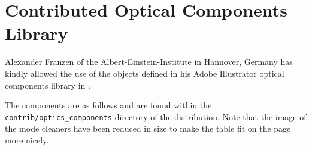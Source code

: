 % 
%
%


\chapter{Contributed Optical Components Library}

Alexander Franzen of the Albert-Einstein-Institute in Hannover, Germany has
kindly allowed the use of the objects defined in his Adobe Illustrator 
optical components library in \pyscript.

The components are as follows and are found within the
\texttt{contrib/optics\_components} directory of the \pyscript distribution.
Note that the image of the mode cleaners have been reduced in size to make
the table fit on the page more nicely.

